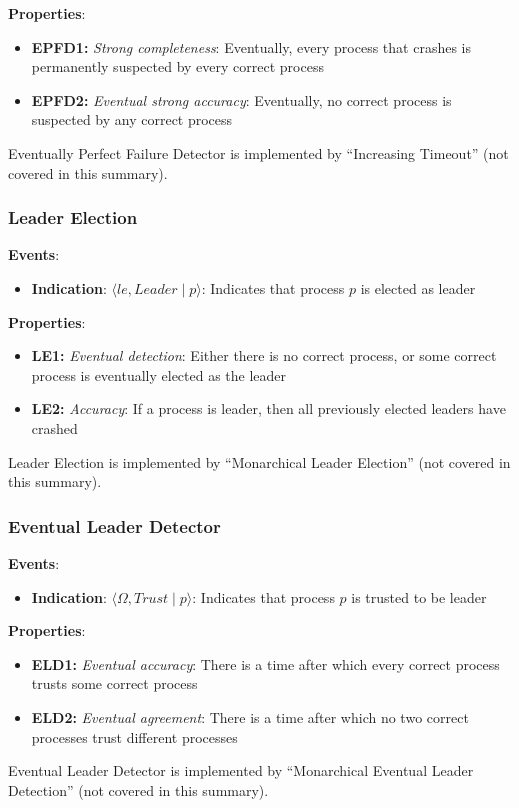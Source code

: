 \documentclass[12pt,A4]{extarticle}
\begin{document}
\textbf{Properties}:
\begin{itemize}
  \item{\textbf{EPFD1:} \textit{Strong completeness}: Eventually, every process that crashes is permanently suspected by every correct process}
  \item{\textbf{EPFD2:} \textit{Eventual strong accuracy}: Eventually, no correct process is suspected by any correct process}
\end{itemize}
Eventually Perfect Failure Detector is implemented by ``Increasing Timeout'' (not covered in this summary).

\subsubsection{Leader Election}
\textbf{Events}:
\begin{itemize}
  \item{\textbf{Indication}: $\langle le, \textit{Leader} \mid p \rangle$: Indicates that process $p$ is elected as leader}
\end{itemize}

\textbf{Properties}:
\begin{itemize}
  \item{\textbf{LE1:} \textit{Eventual detection}: Either there is no correct process, or some correct process is eventually elected as the leader}
  \item{\textbf{LE2:} \textit{Accuracy}: If a process is leader, then all previously elected leaders have crashed}
\end{itemize}
Leader Election is implemented by ``Monarchical Leader Election'' (not covered in this summary).

\subsubsection{Eventual Leader Detector}
\textbf{Events}:
\begin{itemize}
  \item{\textbf{Indication}: $\langle \Omega, \textit{Trust} \mid p \rangle$: Indicates that process $p$ is trusted to be leader}
\end{itemize}

\textbf{Properties}:
\begin{itemize}
  \item{\textbf{ELD1:} \textit{Eventual accuracy}: There is a time after which every correct process trusts some correct process}
  \item{\textbf{ELD2:} \textit{Eventual agreement}: There is a time after which no two correct processes trust different processes}
\end{itemize}
Eventual Leader Detector is implemented by ``Monarchical Eventual Leader Detection'' (not covered in this summary).
\end{document}
